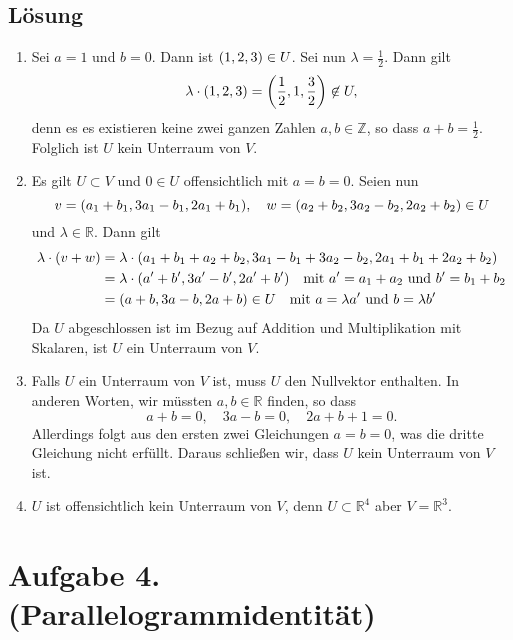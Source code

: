 \documentclass[german,12pt]{homework}
\newcommand{\ZZ}{\mathbb{Z}}
\newcommand{\RR}{\mathbb{R}}
\DeclarePairedDelimiter{\enbrace}{(}{)}
\begin{document}
    \subsection*{Lösung}
    \begin{enumerate}
        \item Sei \(a = 1\) und \(b = 0\). Dann ist \(\enbrace*{1, 2, 3} \in
        U\). Sei nun \(\lambda = \frac{1}{2}\). Dann gilt
        \[\lambda \cdot \enbrace*{1, 2, 3} = \enbrace*{\frac{1}{2}, 1,
        \frac{3}{2}} \not\in U,\]
        denn es es existieren keine zwei ganzen Zahlen \(a, b \in \ZZ\), so
        dass \(a + b = \frac{1}{2}\). Folglich ist \(U\) kein Unterraum von
        \(V\).
        \item Es gilt \(U \subset V\) und \(0 \in U\) offensichtlich mit \(a =
        b = 0\). Seien nun
        \[v = \enbrace*{a_1 + b_1, 3a_1 - b_1, 2a_1 + b_1}, \quad w =
        \enbrace*{a_2 + b_2, 3a_2 - b_2, 2a_2 + b_2} \in U\]
        und \(\lambda \in \RR\). Dann gilt
        \begin{align*}
            \lambda \cdot \enbrace*{v + w} &= \lambda \cdot \enbrace*{a_1 + b_1
            + a_2 + b_2, 3a_1 - b_1 + 3a_2 - b_2, 2a_1 + b_1 + 2a_2 + b_2}\\
            &= \lambda \cdot \enbrace*{a' + b', 3a' - b', 2a' + b'} \quad
            \text{mit }a' = a_1 + a_2\text{ und }b' = b_1 + b_2\\
            &= \enbrace*{a + b, 3a - b, 2a + b} \in U \quad \text{mit }a =
            \lambda{a'}\text{ und }b = \lambda{b'}
        \end{align*}
        Da \(U\) abgeschlossen ist im Bezug auf Addition und Multiplikation mit
        Skalaren, ist \(U\) ein Unterraum von \(V\).
        \item Falls \(U\) ein Unterraum von \(V\) ist, muss \(U\) den
        Nullvektor enthalten. In anderen Worten, wir müssten \(a, b \in \RR\)
        finden, so dass
        \[a + b = 0, \quad 3a - b = 0, \quad 2a + b + 1 = 0.\]
        Allerdings folgt aus den ersten zwei Gleichungen \(a = b = 0\), was die
        dritte Gleichung nicht erfüllt. Daraus schließen wir, dass \(U\) kein
        Unterraum von \(V\) ist.
        \item \(U\) ist offensichtlich kein Unterraum von \(V\), denn \(U
        \subset \mathbb{R}^4\) aber \(V = \mathbb{R}^3\).
    \end{enumerate}

    \section*{Aufgabe 4. (Parallelogrammidentität)}
\end{document}

